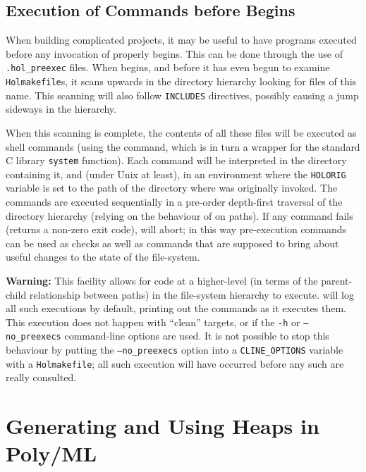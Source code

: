 \subsection{Execution of Commands before \holmake{} Begins}
\label{sec:holmake-preexec}

When building complicated projects, it may be useful to have programs executed before any invocation of \holmake{} properly begins.
This can be done through the use of \texttt{.hol\_preexec} files.
When \holmake{} begins, and before it has even begun to examine \texttt{Holmakefile}s, it scans upwards in the directory hierarchy looking for files of this name.
This scanning will also follow \texttt{INCLUDES} directives, possibly causing a jump sideways in the hierarchy.

When this scanning is complete, the contents of all these files will be executed as shell commands (using the  command, which is in turn a wrapper for the standard C library \texttt{system} function).
Each command will be interpreted in the directory containing it, and (under Unix at least), in an environment where the \texttt{HOLORIG} variable is set to the path of the directory where \holmake{} was originally invoked.
The commands are executed sequentially in a pre-order depth-first traversal of the directory hierarchy (relying on the behaviour of  on paths).
If any command fails (returns a non-zero exit code), \holmake{} will abort; in this way pre-execution commands can be used as checks as well as commands that are supposed to bring about useful changes to the state of the file-system.

\textbf{Warning:} This facility allows for code at a higher-level (in terms of the parent-child relationship between paths) in the file-system hierarchy to execute.
\holmake{} will log all such executions by default, printing out the commands as it executes them.
This execution does not happen with ``clean'' targets, or if the \texttt{-h} or \texttt{--no\_preexecs} command-line options are used.
It is not possible to stop this behaviour by putting the \texttt{--no\_preexecs} option into a \texttt{CLINE\_OPTIONS} variable with a \texttt{Holmakefile}; all such execution will have occurred before any such are really consulted.



\section{\texorpdfstring{Generating and Using Heaps in Poly/ML \HOL{}}{Generating and Using Heaps in Poly/ML HOL}}
\label{sec:polyml-heaps}

